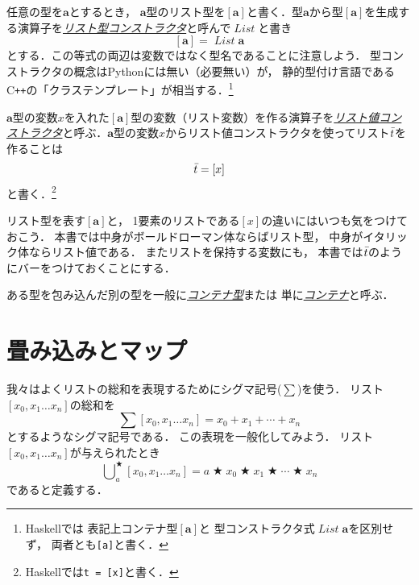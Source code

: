 \documentclass[a5paper,draft]{jsbook}
\newcommand{\programminglanguage}[1]{\textsf{#1}}
\newcommand{\cxx}{\programminglanguage{C}\texttt{++}}
\newcommand{\haskell}{\programminglanguage{Haskell}}
\newcommand{\python}{\programminglanguage{Python}}
\newcommand{\keyword}[1]{{\underline{\emph{#1}}}}
\newcommand{\code}[1]{\texttt{#1}}
\newcommand{\mathTypeParameter}[1]{\mathbf{#1}}
\newcommand{\mathTypeConstructor}[1]{\mathit{#1}} %
\newcommand{\mathListType}[1]{\left[#1\right]}
\newcommand{\mathListVar}[1]{\Bar{#1}}
\DeclareMathOperator{\mathList}{\mathTypeConstructor{List}}
\DeclareMathOperator*{\mathFold}{\bigcup}
\newcommand{\mathBinaryOperator}[1]{\operatorname{#1}}
\newcommand{\mathAnyBinaryOperator}{\mathBinaryOperator{\bigstar}}
\begin{document}
任意の型を$\mathTypeParameter{a}$とするとき，
$\mathTypeParameter{a}$型のリスト型を$\mathListType{\mathTypeParameter{a}}$と書く．型$\mathTypeParameter{a}$から型$\mathListType{\mathTypeParameter{a}}$を生成する演算子を\keyword{リスト型コンストラクタ}と呼んで$\mathList$と書き
\begin{equation}
\mathListType{\mathTypeParameter{a}}=\mathList\mathTypeParameter{a}
\end{equation}
とする．この等式の両辺は変数ではなく型名であることに注意しよう．
型コンストラクタの概念は\python には無い（必要無い）が，
静的型付け言語である\cxx の「クラステンプレート」が相当する．\footnote{\haskell では
表記上コンテナ型$\mathListType{\mathTypeParameter{a}}$と
型コンストラクタ式$\mathList\mathTypeParameter{a}$を区別せず，
両者とも\code{[a]}と書く．}

$\mathTypeParameter{a}$型の変数$x$を入れた$\mathListType{\mathTypeParameter{a}}$型の変数（リスト変数）を作る演算子を\keyword{リスト値コンストラクタ}と呼ぶ．$\mathTypeParameter{a}$型の変数$x$からリスト値コンストラクタを使ってリスト$\mathListVar{t}$を作ることは
\begin{equation}
\mathListVar{t}=[x]
\end{equation}
と書く．\footnote{\haskell では\code{t = [x]}と書く．}

リスト型を表す$\mathListType{\mathTypeParameter{a}}$と，
1要素のリストである$[x]$の違いにはいつも気をつけておこう．
本書では中身がボールドローマン体ならばリスト型，
中身がイタリック体ならリスト値である．
またリストを保持する変数にも，
本書では$\mathListVar{t}$のようにバーをつけておくことにする．

ある型を包み込んだ別の型を一般に\keyword{コンテナ型}または
単に\keyword{コンテナ}と呼ぶ．

\section{畳み込みとマップ}

我々はよくリストの総和を表現するためにシグマ記号($\sum$)を使う．
リスト$[x_0,x_1\dots x_n]$の総和を
\begin{equation}
\sum[x_0,x_1\dots x_n]=x_0+x_1+\dotsb+x_n
\end{equation}
とするようなシグマ記号である．
この表現を一般化してみよう．
リスト$[x_0,x_1\dots x_n]$が与えられたとき
\begin{equation}
\mathFold^{\mathAnyBinaryOperator}_{a}[x_0,x_1\dots x_n]=a\mathAnyBinaryOperator x_0\mathAnyBinaryOperator x_1\mathAnyBinaryOperator\dotsb\mathAnyBinaryOperator x_n
\end{equation}
であると定義する．
\end{document}
